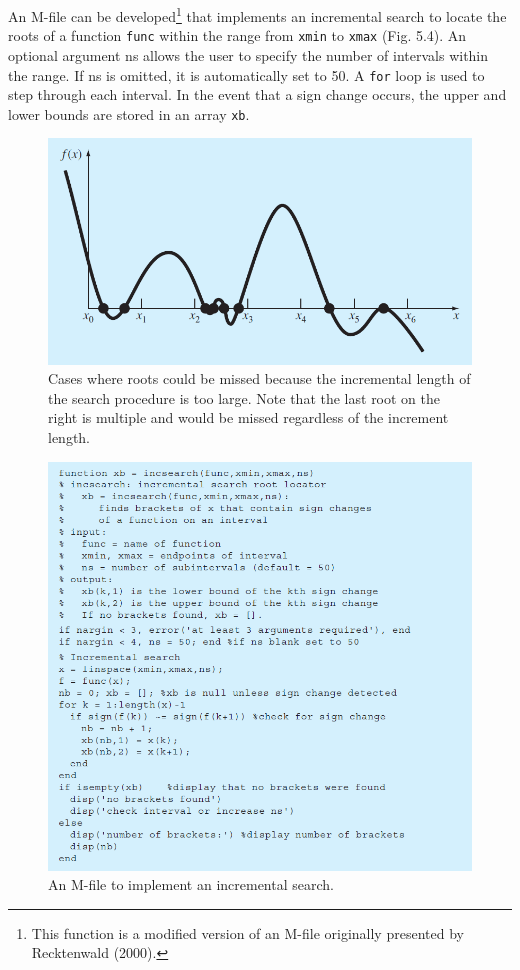 \documentclass[../main.tex]{subfiles}
\begin{document}
An M-file can be developed\footnote{This function is a modified version of an M-file originally
presented by Recktenwald (2000).} that implements an incremental search to locate the roots
of a function \texttt{func} within the range from \texttt{xmin} to \texttt{xmax} (Fig. 5.4). An optional argument
ns allows the user to specify the number of intervals within the range. If ns is omitted, it
is automatically set to 50. A \texttt{for} loop is used to step through each interval. In the event that
a sign change occurs, the upper and lower bounds are stored in an array \texttt{xb}.\\

\bigskip
\begin{figure}[h]
    \includegraphics[width=0.8\linewidth]{./images/fig_5_3}
    \caption{Cases where roots could be missed because the incremental length of the search procedure is
    too large. Note that the last root on the right is multiple and would be missed regardless of the
    increment length.}
\end{figure}
\newpage

\begin{figure}[h]
    \includegraphics[width=0.8\linewidth]{./images/fig_5_4}
    \caption{An M-file to implement an incremental search.}
\end{figure}
\end{document}
